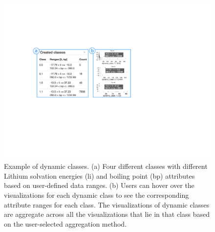   \begin{figure}[h!]
   \centering
   \includegraphics[width=0.9\linewidth]{figures/dcc.pdf}
   \caption{Example of dynamic classes. (a) Four different classes with different Lithium solvation energies (li) and boiling point (bp) attributes based on user-defined data ranges. (b) Users can hover over the visualizations for each dynamic class to see the corresponding attribute ranges for each class. The visualizations of dynamic classes are aggregate across all the visualizations that lie in that class based on the user-selected aggregation method.}
   \label{dcc}
 \end{figure}
